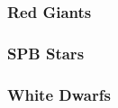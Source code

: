 {\color{red}


\subsubsection{Red Giants}

\subsubsection{SPB Stars}

\subsubsection{White Dwarfs}



}
